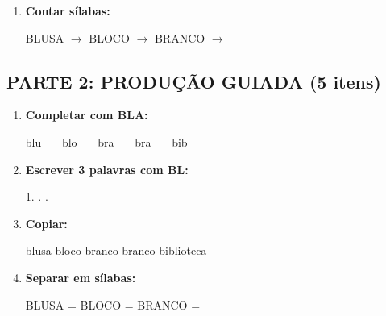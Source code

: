 \begin{exercicio}
\begin{enumerate}
  \item \textbf{Contar sílabas:}
  \begin{center}
  BLUSA $\rightarrow$ \underline{\hspace{0.9cm}} \quad BLOCO $\rightarrow$ \underline{\hspace{0.9cm}} \quad BRANCO $\rightarrow$ \underline{\hspace{0.9cm}}
  \end{center}

\end{enumerate}

\subsection*{PARTE 2: PRODUÇÃO GUIADA (5 itens)}

\begin{enumerate}[resume]

  \item \textbf{Completar com BLA:}
  \begin{center}
  blu\underline{~~~} \quad blo\underline{~~~} \quad bra\underline{~~~} \quad bra\underline{~~~} \quad bib\underline{~~~}
  \end{center}

  \item \textbf{Escrever 3 palavras com BL:}
  \begin{center}
  1. \underline{\hspace{3cm}} . \underline{\hspace{3cm}} . \underline{\hspace{3cm}}
  \end{center}

  \item \textbf{Copiar:}
  \begin{center}
  blusa \quad bloco \quad branco \quad branco \quad biblioteca
  \end{center}

  \item \textbf{Separar em sílabas:}
  \begin{center}
  BLUSA = \underline{\hspace{1cm}} \underline{\hspace{1cm}} \quad BLOCO = \underline{\hspace{1cm}} \underline{\hspace{1cm}} \quad BRANCO = \underline{\hspace{1cm}} \underline{\hspace{1cm}}
  \end{center}


\end{enumerate}
\end{exercicio}
